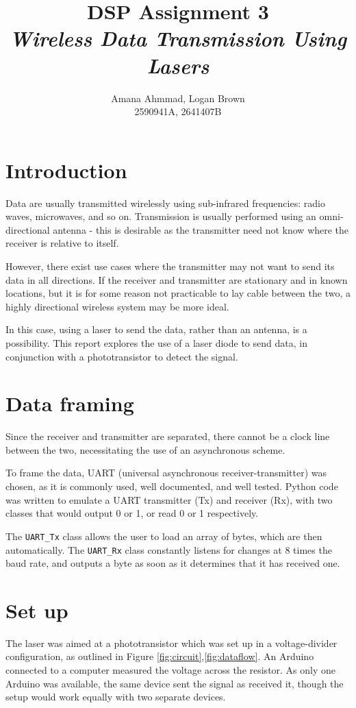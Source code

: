 \documentclass{article}
\title{DSP Assignment 3 \\ \textit{Wireless Data Transmission Using Lasers}}
\author{Amana Ahmmad, Logan Brown \\ 2590941A, 2641407B}
\begin{document}
\maketitle

\begin{multicols}{2}

\section{Introduction}
Data are usually transmitted wirelessly using sub-infrared frequencies: radio waves, microwaves, and so on. Transmission is usually performed using an omni-directional antenna - this is desirable as the transmitter need not know where the receiver is relative to itself.  

However, there exist use cases where the transmitter may not want to send its data in all directions. If the receiver and transmitter are stationary and in known locations, but it is for some reason not practicable to lay cable between the two, a highly directional wireless system may be more ideal. 

In this case, using a laser to send the data, rather than an antenna, is a possibility. This report explores the use of a laser diode to send data, in conjunction with a phototransistor to detect the signal.

\section{Data framing}
Since the receiver and transmitter are separated, there cannot be a clock line between the two, necessitating the use of an asynchronous scheme. 

To frame the data, UART (universal asynchronous receiver-transmitter) was chosen, as it is commonly used, well documented, and well tested. Python code was written to emulate a UART transmitter (Tx) and receiver (Rx), with two classes that would output 0 or 1, or read 0 or 1 respectively.

The \texttt{UART\_Tx} class allows the user to load an array of bytes, which are then  automatically. The \texttt{UART\_Rx} class constantly listens for changes at 8 times the baud rate, and outputs a byte as soon as it determines that it has received one.

\section{Set up}
The laser was aimed at a phototransistor which was set up in a voltage-divider configuration, as outlined in Figure \ref{fig:circuit},\ref{fig:dataflow}. An Arduino connected to a computer measured the voltage across the resistor. As only one Arduino was available, the same device sent the signal as received it, though the setup would work equally with two separate devices. 


\end{multicols}
\end{document}
